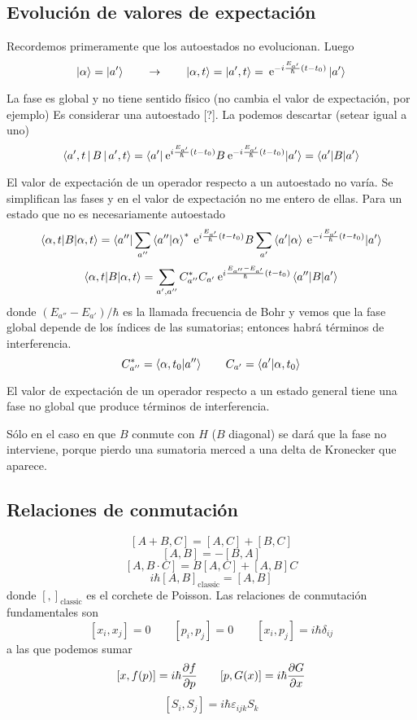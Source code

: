 \documentclass[10pt,oneside]{CBFT_book}
\begin{document}
\subsection{Evolución de valores de expectación}

Recordemos primeramente que los autoestados no evolucionan. Luego 
\[
	\Ket{\alpha} = \Ket{a'} 
	\qquad \to \qquad 
	\Ket{\alpha,t} = \Ket{a',t} =  
	\:\mathrm{e}^{-i\frac{E_{a'}}{\hbar}(t-t_0)} \Ket{a'}
\]

La fase es global y no tiene sentido físico (no cambia el valor de expectación, por ejemplo)
Es considerar una autoestado [?]. La podemos descartar (setear igual a uno)
\[
	\Braket{a',t|B|a',t} = 
	\braket{a'|\:\mathrm{e}^{i\frac{E_{a'}}{\hbar}(t-t_0)}B 
	\:\mathrm{e}^{-i\frac{E_{a'}}{\hbar}(t-t_0)}|a'} = \braket{a'|B|a'}
\]

El valor de expectación de un operador respecto a un autoestado no varía.
Se simplifican las fases y en el valor de expectación no me entero de ellas.
Para un estado que no es necesariamente autoestado
\[
	\braket{\alpha,t|B|\alpha,t} =
	\braket{a''|\sum_{a''} \braket{a''|\alpha}^*\:\mathrm{e}^{i\frac{E_{a'}}{\hbar}(t-t_0)} B 
	\sum_{a'} \braket{a'|\alpha} \:\mathrm{e}^{-i\frac{E_{a'}}{\hbar}(t-t_0)}|a'}
\]
\[
	\braket{\alpha,t|B|\alpha,t} = \sum_{a',a''} C_{a''}^* C_{a'} 
	\:\mathrm{e}^{i\frac{E_{a''}-E_{a'}}{\hbar}(t-t_0)} \braket{a''|  B |a'}
\]
donde $(E_{a''}-E_{a'})/\hbar$ es la llamada frecuencia de Bohr y vemos que la fase
global depende de los índices de las sumatorias; entonces habrá términos de interferencia.
\[
	C_{a''}^* = \braket{\alpha,t_0|a''} \qquad C_{a'} = \braket{a'| \alpha,t_0}  
\]

El valor de expectación de un operador respecto a un estado general tiene una fase no global 
que produce términos de interferencia.

Sólo en el caso en que $B$ conmute con $H$ ($B$ diagonal) se dará que la fase no interviene,
porque pierdo una sumatoria merced a una delta de Kronecker que aparece.

\subsection{Relaciones de conmutación}

\[
	[ A + B, C] = [A, C] + [B,C] 
\]
\[
	[A, B] = - [B,A]
\]
\[
	[A, B\cdot C] = B[A,C] +  [A,B]C
\]
\[
	i\hbar[ A, B]_{\text{classic}} = [A, B]
\]
donde $[ , ]_{\text{classic}}$ es el corchete de Poisson.
Las relaciones de conmutación fundamentales son 
\[
	[x_i, x_j] = 0 \qquad [p_i, p_j]=0 \qquad [x_i,p_j] =i\hbar\delta_{ij}
\]
a las que podemos sumar
\[
	[x,f(p)] = i\hbar\frac{\partial^{\hspace{-0.05em}} {f}}{\partial {p}^{\hspace{-0.05em}}} \qquad [p,G(x)] = i\hbar\frac{\partial^{\hspace{-0.05em}} {G}}{\partial {x}^{\hspace{-0.05em}}} 
\]
\[
	[S_i,S_j] = i\hbar \varepsilon_{ijk}S_k
\]
\end{document}

